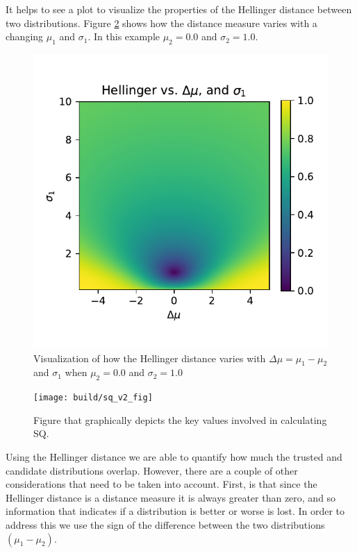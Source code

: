It helps to see a plot to visualize the properties of the Hellinger distance between two distributions. Figure \ref{fig:hellinger_surf} shows how the distance measure varies with a changing $\mu_1$ and $\sigma_1$. In this example $\mu_2=0.0$ and $\sigma_2=1.0$.

\begin{figure}[tbp]
    \centering
    \includegraphics[width=0.9\linewidth]{Figures/hellinger_surf}
    \caption{Visualization of how the Hellinger distance varies with $\Delta\mu=\mu_1-\mu_2$ and $\sigma_1$ when $\mu_2=0.0$ and $\sigma_2=1.0$}
    \label{fig:hellinger_surf}
\end{figure}
\begin{figure}[tbp]
    \centering
    \texttt{[image: build/sq\_v2\_fig]}
    \caption{Figure that graphically depicts the key values involved in calculating SQ.}
    \label{fig:hellinger_surf}
\end{figure}

Using the Hellinger distance we are able to quantify how much the trusted and candidate distributions overlap. However, there are a couple of other considerations that need to be taken into account. First, is that since the Hellinger distance is a distance measure it is always greater than zero, and so information that indicates if a distribution is better or worse is lost. In order to address this we use the sign of the difference between the two distributions $(\mu_1-\mu_2)$.

